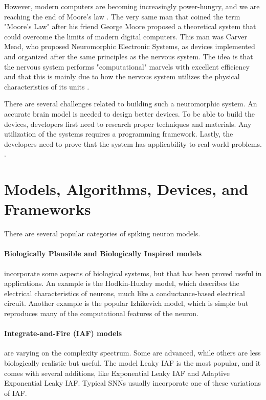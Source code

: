 However, modern computers are becoming increasingly power-hungry, and we are reaching the end of Moore's law \cite{mead_neuromorphic_1990} \cite{moore_cramming_1998}.
The very same man that coined the term "Moore's Law" after his friend George Moore proposed a theoretical system that could overcome the limits of modern digital computers.
This man was Carver Mead, who proposed Neuromorphic Electronic Systems, as devices implemented and organized after the same principles as the nervous system.
The idea is that the nervous system performs "computational" marvels with excellent efficiency and that this is mainly due to how the nervous system utilizes the physical characteristics of its units \cite{mead_neuromorphic_1990}.

There are several challenges related to building such a neuromorphic system.
An accurate brain model is needed to design better devices.
To be able to build the devices, developers first need to research proper techniques and materials.
Any utilization of the systems requires a programming framework.
Lastly, the developers need to prove that the system has applicability to real-world problems.
\cite{schuman_survey_2017}.

\section{Models, Algorithms, Devices, and Frameworks}
There are several popular categories of spiking neuron models.

\paragraph{Biologically Plausible and Biologically Inspired models} incorporate some aspects of biological systems, but that has been proved useful in applications.
An example is the Hodkin-Huxley model, which describes the electrical characteristics of neurons, much like a conductance-based electrical circuit.
Another example is the popular Izhikevich model, which is simple but reproduces many of the computational features of the neuron.
\cite{schuman_survey_2017}

\paragraph{Integrate-and-Fire (IAF) models} are varying on the complexity spectrum. Some are advanced, while others are less biologically realistic but useful.
The model Leaky IAF is the most popular, and it comes with several additions, like Exponential Leaky IAF and Adaptive Exponential Leaky IAF. Typical SNNs usually incorporate one of these variations of IAF.
\cite{schuman_survey_2017}

